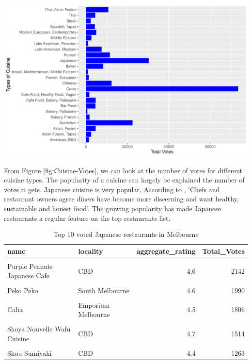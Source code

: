 \documentclass[11pt,a4paper,]{article}
\let\origfigure\figure
\let\endorigfigure\endfigure
\renewenvironment{figure}[1][2] {
    \expandafter\origfigure\expandafter[H]
} {
    \endorigfigure
}%
\begin{document}
\begin{figure}
\centering
\includegraphics{assignment4_files/figure-latex/Cuisine-Votes-1.pdf}
\caption{\label{fig:Cuisine-Votes}Number of Votes for different Cuisines in Melbourne}
\end{figure}

From Figure \ref{fig:Cuisine-Votes}, we can look at the number of votes for different cuisine types. The popularity of a cuisine can largely be explained the number of votes it gets. Japanese cuisine is very popular. According to \textcite{ATR}, `Chefs and restaurant owners agree diners have become more discerning and want healthy, sustainable and honest food'. The growing popularity has made Japanese restaurants a regular feature on the top restaurants list.

\begin{table}[!h]

\caption{\label{tab:top10-Jap}Top 10 voted Japanese restaurants in Melbourne}
\centering
\begin{tabular}[t]{llrr}
\toprule
name & locality & aggregate\_rating & Total\_Votes\\
\midrule
\cellcolor{gray!6}{Hakata Gensuke Ramen Professionals} & \cellcolor{gray!6}{CBD} & \cellcolor{gray!6}{4.7} & \cellcolor{gray!6}{2337}\\
Purple Peanuts Japanese Cafe & CBD & 4.6 & 2142\\
\cellcolor{gray!6}{Mr. Miyagi} & \cellcolor{gray!6}{Windsor} & \cellcolor{gray!6}{4.7} & \cellcolor{gray!6}{2024}\\
Peko Peko & South Melbourne & 4.6 & 1990\\
\cellcolor{gray!6}{Sakura Kaiten Sushi} & \cellcolor{gray!6}{CBD} & \cellcolor{gray!6}{4.6} & \cellcolor{gray!6}{1856}\\
\addlinespace
Calia & Emporium Melbourne & 4.5 & 1806\\
\cellcolor{gray!6}{Shira Nui} & \cellcolor{gray!6}{Glen Waverley} & \cellcolor{gray!6}{4.8} & \cellcolor{gray!6}{1633}\\
Shoya Nouvelle Wafu Cuisine & CBD & 4.7 & 1514\\
\cellcolor{gray!6}{Kisumé} & \cellcolor{gray!6}{CBD} & \cellcolor{gray!6}{4.5} & \cellcolor{gray!6}{1346}\\
Shou Sumiyaki & CBD & 4.4 & 1263\\
\bottomrule
\end{tabular}
\end{table}
\end{document}
